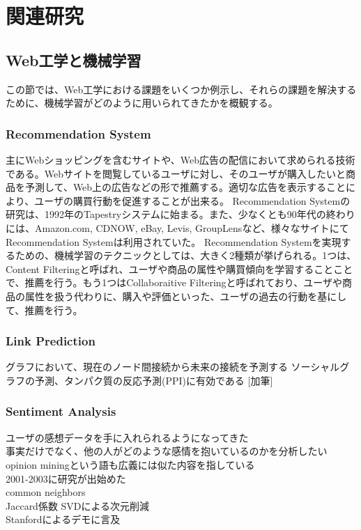 \chapter{関連研究}
\section{Web工学と機械学習}
この節では、Web工学における課題をいくつか例示し、それらの課題を解決するために、機械学習がどのように用いられてきたかを概観する。
\subsection{Recommendation System}
主にWebショッピングを含むサイトや、Web広告の配信において求められる技術である。Webサイトを閲覧しているユーザに対し、そのユーザが購入したいと商品を予測して、Web上の広告などの形で推薦する。適切な広告を表示することにより、ユーザの購買行動を促進することが出来る。
Recommendation Systemの研究は、1992年のTapestryシステムに始まる\cite{goldberg1992using}。また、少なくとも90年代の終わりには、Amazon.com, CDNOW, eBay, Levis, GroupLensなど、様々なサイトにてRecommendation Systemは利用されていた\cite{resnick1997recommender}。
Recommendation Systemを実現するための、機械学習のテクニックとしては、大きく2種類が挙げられる\cite{koren2009matrix}。1つは、Content Filteringと呼ばれ、ユーザや商品の属性や購買傾向を学習することことで、推薦を行う。もう1つはCollaboraitive Filteringと呼ばれており、ユーザや商品の属性を扱う代わりに、購入や評価といった、ユーザの過去の行動を基にして、推薦を行う。
\subsection{Link Prediction}
グラフにおいて、現在のノード間接続から未来の接続を予測する
ソーシャルグラフの予測、タンパク質の反応予測(PPI)に有効である
[加筆]
\subsection{Sentiment Analysis}
ユーザの感想データを手に入れられるようになってきた\\
事実だけでなく、他の人がどのような感情を抱いているのかを分析したい\\
opinion miningという語も広義には似た内容を指している\\
2001-2003に研究が出始めた\\
common neighbors\\
Jaccard係数 SVDによる次元削減\\
Stanfordによるデモに言及

